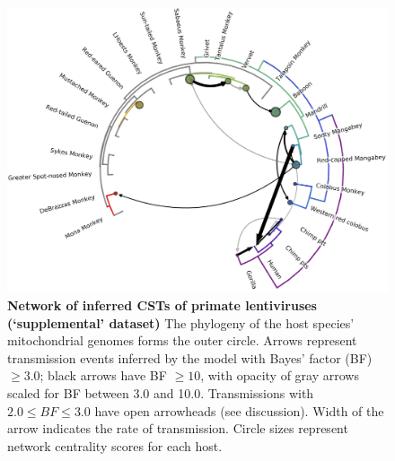 \begin{figure}[ht!]
  \begin{centering}
    \includegraphics[width=.8\linewidth]{./png/siv_suppdata_cst.png}
  	\caption[Network of inferred CSTs of primate lentiviruses (`supplemental' dataset)]{\textbf{Network of inferred CSTs of primate lentiviruses (`supplemental' dataset) }
    The phylogeny of the host species' mitochondrial genomes forms the outer circle.
    Arrows represent transmission events inferred by the model with Bayes' factor (BF) $\geq 3.0$; black arrows have BF $\geq 10$, with opacity of gray arrows scaled for BF between 3.0 and 10.0.
    Transmissions with $2.0 \leq BF \leq 3.0$ have open arrowheads (see discussion).
    Width of the arrow indicates the rate of transmission.
    Circle sizes represent network centrality scores for each host.
        }
  	\label{siv_suppdata_cst}
  \end{centering}
\end{figure}

